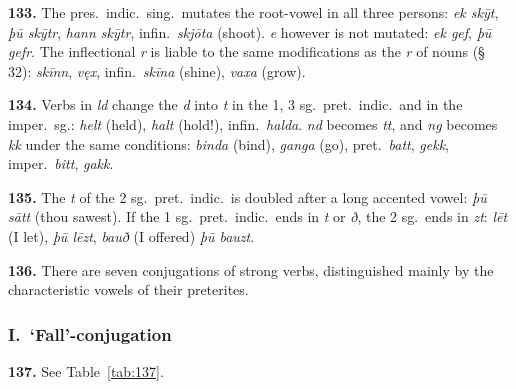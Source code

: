 \documentclass[12pt,letterpaper]{book}
\begin{document}
\textbf{133.} The pres.\ indic.\ sing.\ mutates the root-vowel in all three
persons: \textit{ek skȳt}, \textit{þū skȳtr}, \textit{hann skȳtr},
infin.\ \textit{skjōta} (shoot).  \textit{e} however is not mutated: \textit{ek gef},
\textit{þū gefr}.  The inflectional \textit{r} is liable to the same
modifications as the \textit{r} of nouns (§ 32): \textit{skīnn}, \textit{vęx},
infin.\ \textit{skīna} (shine), \textit{vaxa} (grow).

\textbf{134.} Verbs in \textit{ld} change the \textit{d} into \textit{t} in the 1, 3
sg.\ pret.\ indic.\ and in the imper.\ sg.: \textit{helt} (held), \textit{halt}
(hold!), infin.\ \textit{halda}.  \textit{nd} becomes \textit{tt}, and \textit{ng}
becomes \textit{kk} under the same conditions: \textit{binda} (bind),
\textit{ganga} (go), pret.\ \textit{batt}, \textit{gekk}, imper.\ \textit{bitt},
\textit{gakk}.

\textbf{135.} The \textit{t} of the 2 sg.\ pret.\ indic.\ is doubled after a long
accented vowel: \textit{þū sātt} (thou sawest).  If the 1 sg.\ pret.\ indic.\ ends
in \textit{t} or \textit{ð}, the 2 sg.\ ends in \textit{zt}:
\textit{lēt} (I let), \textit{þū lēzt}, \textit{bauð} (I offered) \textit{þū
bauzt}.

\textbf{136.} There are seven conjugations of strong verbs, distinguished
mainly by the characteristic vowels of their preterites.

\subsubsection{I.\ \textbf{`Fall'}-conjugation}

\textbf{137.} See Table~\ref{tab:137}.
\end{document}
